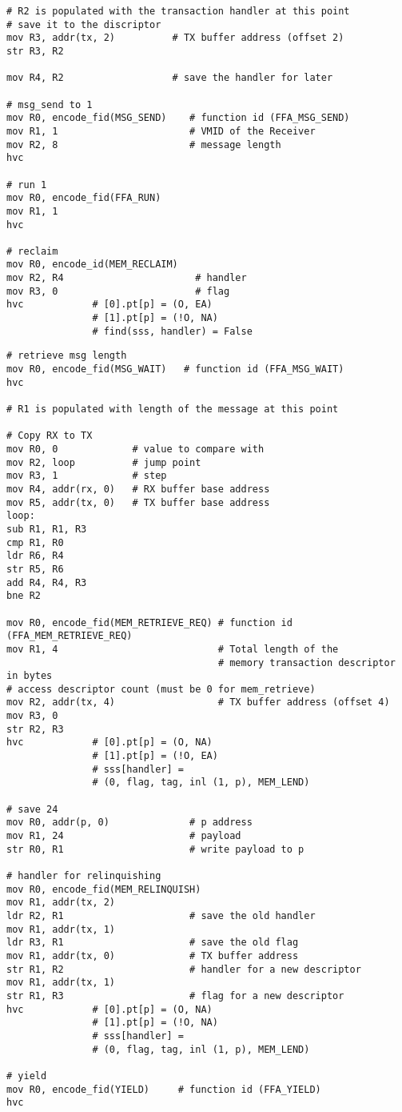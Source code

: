 \documentclass{article}
\begin{document}
\begin{lstlisting}[caption={VM 0}]
# R2 is populated with the transaction handler at this point
# save it to the discriptor
mov R3, addr(tx, 2)          # TX buffer address (offset 2)
str R3, R2

mov R4, R2                   # save the handler for later

# msg_send to 1
mov R0, encode_fid(MSG_SEND)    # function id (FFA_MSG_SEND)
mov R1, 1                       # VMID of the Receiver
mov R2, 8                       # message length
hvc

# run 1
mov R0, encode_fid(FFA_RUN)
mov R1, 1
hvc

# reclaim
mov R0, encode_id(MEM_RECLAIM)
mov R2, R4                       # handler
mov R3, 0                        # flag
hvc            # [0].pt[p] = (O, EA)
               # [1].pt[p] = (!O, NA)
               # find(sss, handler) = False       
\end{lstlisting}

\begin{lstlisting}[caption={VM 1}]
# retrieve msg length
mov R0, encode_fid(MSG_WAIT)   # function id (FFA_MSG_WAIT)
hvc

# R1 is populated with length of the message at this point

# Copy RX to TX
mov R0, 0             # value to compare with
mov R2, loop          # jump point
mov R3, 1             # step
mov R4, addr(rx, 0)   # RX buffer base address
mov R5, addr(tx, 0)   # TX buffer base address
loop:
sub R1, R1, R3
cmp R1, R0
ldr R6, R4
str R5, R6
add R4, R4, R3
bne R2

mov R0, encode_fid(MEM_RETRIEVE_REQ) # function id (FFA_MEM_RETRIEVE_REQ)
mov R1, 4                            # Total length of the  
                                     # memory transaction descriptor in bytes
# access descriptor count (must be 0 for mem_retrieve)
mov R2, addr(tx, 4)                  # TX buffer address (offset 4)
mov R3, 0
str R2, R3                                    
hvc            # [0].pt[p] = (O, NA)
               # [1].pt[p] = (!O, EA)
               # sss[handler] = 
               # (0, flag, tag, inl (1, p), MEM_LEND)

# save 24
mov R0, addr(p, 0)              # p address
mov R1, 24                      # payload
str R0, R1                      # write payload to p

# handler for relinquishing
mov R0, encode_fid(MEM_RELINQUISH)
mov R1, addr(tx, 2)
ldr R2, R1                      # save the old handler
mov R1, addr(tx, 1)
ldr R3, R1                      # save the old flag
mov R1, addr(tx, 0)             # TX buffer address
str R1, R2                      # handler for a new descriptor
mov R1, addr(tx, 1)
str R1, R3                      # flag for a new descriptor
hvc            # [0].pt[p] = (O, NA)
               # [1].pt[p] = (!O, NA)
               # sss[handler] = 
               # (0, flag, tag, inl (1, p), MEM_LEND)

# yield
mov R0, encode_fid(YIELD)     # function id (FFA_YIELD)
hvc
\end{lstlisting}
\end{document}
